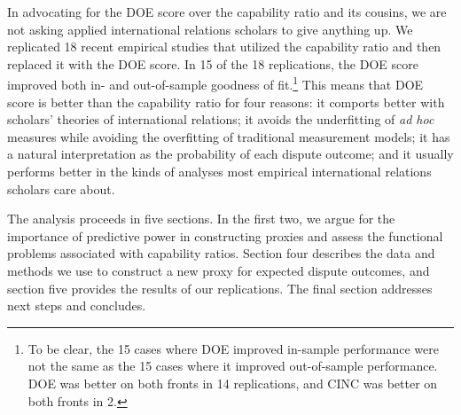 In advocating for the DOE score over the capability ratio and its cousins, we are not asking applied international relations scholars to give anything up.  We replicated 18 recent empirical studies that utilized the capability ratio and then replaced it with the DOE score.  In 15 of the 18 replications, the DOE score improved both in- and out-of-sample goodness of fit.\footnote{To be clear, the 15 cases where DOE improved in-sample performance were not the same as the 15 cases where it improved out-of-sample performance.  DOE was better on both fronts in 14 replications, and CINC was better on both fronts in 2.}  This means that DOE score is better than the capability ratio for four reasons:  it comports better with scholars' theories of international relations; it avoids the underfitting of \emph{ad hoc} measures while avoiding the overfitting of traditional measurement models; it has a natural interpretation as the probability of each dispute outcome; and it usually performs better in the kinds of analyses most empirical international relations scholars care about.

The analysis proceeds in five sections.
In the first two, we argue for the importance of predictive power in constructing proxies and assess the functional problems associated with capability ratios.
Section four describes the data and methods we use to construct a new proxy for expected dispute outcomes, and section five provides the results of our replications.
The final section addresses next steps and concludes.

